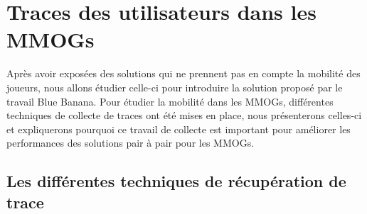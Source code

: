 \newpage
\section{Traces des utilisateurs dans les MMOGs}
	\label{trace}
 	Après avoir exposées des solutions qui ne prennent pas en compte la mobilité des joueurs, nous allons étudier celle-ci pour introduire la solution proposé par le travail Blue Banana. Pour étudier la mobilité dans les MMOGs, différentes techniques de collecte de traces ont été mises en place, nous présenterons celles-ci et expliquerons pourquoi ce travail de collecte est important pour améliorer les performances des solutions pair à pair pour les MMOGs.
	\subsection{Les différentes techniques de récupération de trace}
